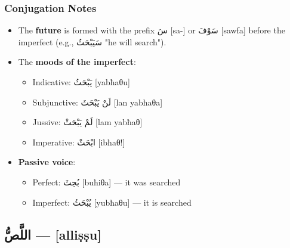\documentclass[letterpaper,12pt]{article}
\begin{document}
\subsubsection*{Conjugation Notes}
\begin{itemize}
  \item The \textbf{future} is formed with the prefix \textarabic{سَ} [sa-] or \textarabic{سَوْفَ} [sawfa] before the imperfect (e.g., \textarabic{سَيَبْحَثُ} "he will search").
  \item The \textbf{moods of the imperfect}: 
    \begin{itemize}
      \item Indicative: \textarabic{يَبْحَثُ} [yabħaθu] 
      \item Subjunctive: \textarabic{لَنْ يَبْحَثَ} [lan yabħaθa]
      \item Jussive: \textarabic{لَمْ يَبْحَثْ} [lam yabħaθ]
      \item Imperative: \textarabic{ابْحَثْ} [ibħaθ!]
    \end{itemize}
  \item \textbf{Passive voice}: 
    \begin{itemize}
      \item Perfect: \textarabic{بُحِثَ} [buħiθa] — it was searched
      \item Imperfect: \textarabic{يُبْحَثُ} [yubħaθu] — it is searched
    \end{itemize}
\end{itemize}

\subsection{\textarabic{اللَّصُّ} — [alliṣṣu]}
\end{document}
